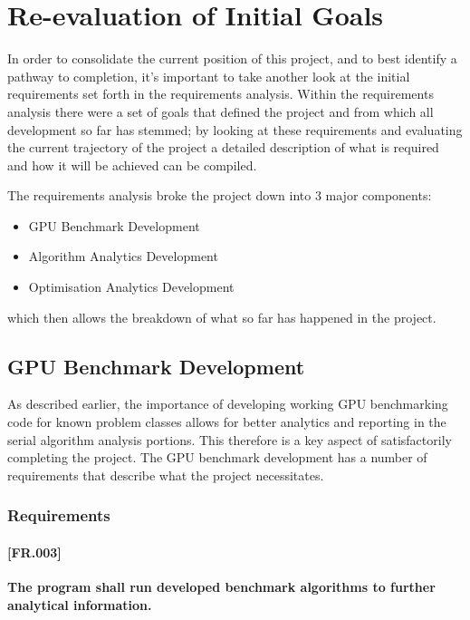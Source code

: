 
\section{Re-evaluation of Initial Goals}
In order to consolidate the current position of this project, and to best identify a pathway to completion, it's important to take another look at the initial requirements set forth in the requirements analysis. Within the requirements analysis there were a set of goals that defined the project and from which all development so far has stemmed; by looking at these requirements and evaluating the current trajectory of the project a detailed description of what is required and how it will be achieved can be compiled.

The requirements analysis broke the project down into 3 major components:

\begin{itemize}
\item GPU Benchmark Development
\item Algorithm Analytics Development
\item Optimisation Analytics Development
\end{itemize}

which then allows the breakdown of what so far has happened in the project.

\subsection{GPU Benchmark Development}
As described earlier, the importance of developing working GPU benchmarking code for known problem classes allows for better analytics and reporting in the serial algorithm analysis portions. This therefore is a key aspect of satisfactorily completing the project. The GPU benchmark development has a number of requirements that describe what the project necessitates.

\subsubsection{Requirements}

\paragraph{[FR.003]}
\textbf{The program shall run developed benchmark algorithms to further analytical information.}

